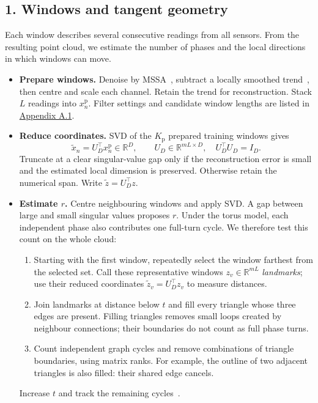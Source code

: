 \documentclass[11pt,a4paper]{article}
\newcommand{\R}{\mathbb R}
\begin{document}
\subsection*{1. Windows and tangent geometry}
Each window describes several consecutive readings from all sensors.
From the resulting point cloud, we estimate the number of phases and the
local directions in which windows can move.
\begin{itemize}
\setlength{\itemsep}{2pt}
\item \textbf{Prepare windows.}
Denoise by MSSA~\citep{GrothGhil2011}, subtract a locally smoothed
trend~\citep{SavitzkyGolay1964}, then centre and scale each channel.
Retain the trend for reconstruction. Stack $L$ readings into $x_n^{\mathrm p}$.
Filter settings and candidate window lengths are listed in
\hyperref[app:preparation]{Appendix A.1}.
\item \textbf{Reduce coordinates.}
SVD of the $K_{\mathrm p}$ prepared training windows gives
\[
\widetilde x_n=U_D^\top x_n^{\mathrm p}\in\R^D,
\qquad U_D\in\R^{mL\times D},\quad U_D^\top U_D=I_D.
\]
Truncate at a clear singular-value gap only if the reconstruction error
is small and the estimated local dimension is preserved.
Otherwise retain the numerical span. Write $\widetilde z=U_D^\top z$.
\item \textbf{Estimate $r$.}
Centre neighbouring windows and apply SVD. A gap between large and small
singular values proposes $r$. Under the torus model, each independent
phase also contributes one full-turn cycle. We therefore test this count
on the whole cloud:
\begin{enumerate}
\setlength{\itemsep}{1pt}
\item Starting with the first window, repeatedly select the window farthest
from the selected set. Call these representative windows
$z_v\in\R^{mL}$ \emph{landmarks}; use their reduced coordinates
$\widetilde z_v=U_D^\top z_v$ to measure distances.
\item Join landmarks at distance below $t$ and fill every triangle whose
three edges are present. Filling triangles removes small loops created
by neighbour connections; their boundaries do not count as full phase turns.
\item Count independent graph cycles and remove combinations of triangle
boundaries, using matrix ranks. For example, the outline of two adjacent
triangles is also filled: their shared edge cancels.
\end{enumerate}
Increase $t$ and track the remaining cycles~\citep{deSilva2011,Bauer2021}.

\end{itemize}
\end{document}
